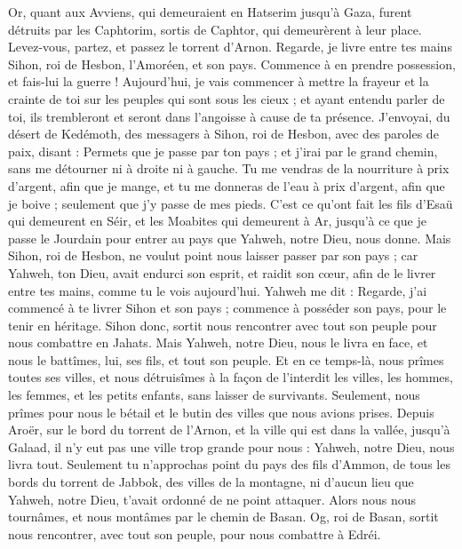 \begin{multicols}{2}
Or, quant aux Avviens, qui demeuraient en Hatserim jusqu'à Gaza, furent détruits par les Caphtorim, sortis de Caphtor, qui demeurèrent à leur place.
Levez-vous, partez, et passez le torrent d'Arnon. Regarde, je livre entre tes mains Sihon, roi de Hesbon, l'Amoréen, et son pays. Commence à en prendre possession, et fais-lui la guerre !
Aujourd'hui, je vais commencer à mettre la frayeur et la crainte de toi sur les peuples qui sont sous les cieux ; et ayant entendu parler de toi, ils trembleront et seront dans l'angoisse à cause de ta présence.
J'envoyai, du désert de Kedémoth, des messagers à Sihon, roi de Hesbon, avec des paroles de paix, disant :
Permets que je passe par ton pays ; et j'irai par le grand chemin, sans me détourner ni à droite ni à gauche.
Tu me vendras de la nourriture à prix d'argent, afin que je mange, et tu me donneras de l'eau à prix d'argent, afin que je boive ; seulement que j'y passe de mes pieds.
C'est ce qu'ont fait les fils d'Esaü qui demeurent en Séir, et les Moabites qui demeurent à Ar, jusqu'à ce que je passe le Jourdain pour entrer au pays que Yahweh, notre Dieu, nous donne.
Mais Sihon, roi de Hesbon, ne voulut point nous laisser passer par son pays ; car Yahweh, ton Dieu, avait endurci son esprit, et raidit son cœur, afin de le livrer entre tes mains, comme tu le vois aujourd'hui.
Yahweh me dit : Regarde, j'ai commencé à te livrer Sihon et son pays ; commence à posséder son pays, pour le tenir en héritage.
Sihon donc, sortit nous rencontrer avec tout son peuple pour nous combattre en Jahats.
Mais Yahweh, notre Dieu, nous le livra en face, et nous le battîmes, lui, ses fils, et tout son peuple.
Et en ce temps-là, nous prîmes toutes ses villes, et nous détruisîmes à la façon de l'interdit les villes, les hommes, les femmes, et les petits enfants, sans laisser de survivants.
Seulement, nous prîmes pour nous le bétail et le butin des villes que nous avions prises.
Depuis Aroër, sur le bord du torrent de l'Arnon, et la ville qui est dans la vallée, jusqu'à Galaad, il n'y eut pas une ville trop grande pour nous : Yahweh, notre Dieu, nous livra tout.
Seulement tu n'approchas point du pays des fils d'Ammon, de tous les bords du torrent de Jabbok, des villes de la montagne, ni d'aucun lieu que Yahweh, notre Dieu, t'avait ordonné de ne point attaquer.
\VerseOne{}Alors nous nous tournâmes, et nous montâmes par le chemin de Basan. Og, roi de Basan, sortit nous rencontrer, avec tout son peuple, pour nous combattre à Edréi.

\end{multicols}
